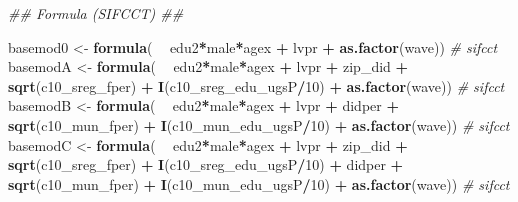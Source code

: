 \documentclass[
]{article}
\newenvironment{Shaded}{\begin{snugshade}}{\end{snugshade}}
\newcommand{\CommentTok}[1]{\textcolor[rgb]{0.56,0.35,0.01}{\textit{#1}}}
\newcommand{\DecValTok}[1]{\textcolor[rgb]{0.00,0.00,0.81}{#1}}
\newcommand{\KeywordTok}[1]{\textcolor[rgb]{0.13,0.29,0.53}{\textbf{#1}}}
\newcommand{\NormalTok}[1]{#1}
\newcommand{\OperatorTok}[1]{\textcolor[rgb]{0.81,0.36,0.00}{\textbf{#1}}}
\newcommand{\StringTok}[1]{\textcolor[rgb]{0.31,0.60,0.02}{#1}}
\begin{document}
\begin{Shaded}
\begin{Highlighting}[]
\CommentTok{## Formula (SIFCCT) ##}

\NormalTok{basemod0 <-}\StringTok{ }\KeywordTok{formula}\NormalTok{(  }\OperatorTok{~}\StringTok{ }\NormalTok{edu2}\OperatorTok{*}\NormalTok{male}\OperatorTok{*}\NormalTok{agex }\OperatorTok{+}\StringTok{ }\NormalTok{lvpr }\OperatorTok{+}\StringTok{  }
\StringTok{                        }\KeywordTok{as.factor}\NormalTok{(wave)) }\CommentTok{# sifcct}
\NormalTok{basemodA <-}\StringTok{ }\KeywordTok{formula}\NormalTok{(  }\OperatorTok{~}\StringTok{ }\NormalTok{edu2}\OperatorTok{*}\NormalTok{male}\OperatorTok{*}\NormalTok{agex }\OperatorTok{+}\StringTok{ }\NormalTok{lvpr }\OperatorTok{+}\StringTok{  }
\StringTok{                        }\NormalTok{zip_did }\OperatorTok{+}\StringTok{ }\KeywordTok{sqrt}\NormalTok{(c10_sreg_fper) }\OperatorTok{+}\StringTok{ }\KeywordTok{I}\NormalTok{(c10_sreg_edu_ugsP}\OperatorTok{/}\DecValTok{10}\NormalTok{) }\OperatorTok{+}\StringTok{ }
\StringTok{                        }\KeywordTok{as.factor}\NormalTok{(wave)) }\CommentTok{# sifcct}
\NormalTok{basemodB <-}\StringTok{ }\KeywordTok{formula}\NormalTok{(  }\OperatorTok{~}\StringTok{ }\NormalTok{edu2}\OperatorTok{*}\NormalTok{male}\OperatorTok{*}\NormalTok{agex }\OperatorTok{+}\StringTok{ }\NormalTok{lvpr }\OperatorTok{+}\StringTok{  }
\StringTok{                        }\NormalTok{didper }\OperatorTok{+}\StringTok{ }\KeywordTok{sqrt}\NormalTok{(c10_mun_fper) }\OperatorTok{+}\StringTok{ }\KeywordTok{I}\NormalTok{(c10_mun_edu_ugsP}\OperatorTok{/}\DecValTok{10}\NormalTok{) }\OperatorTok{+}\StringTok{ }
\StringTok{                        }\KeywordTok{as.factor}\NormalTok{(wave)) }\CommentTok{# sifcct}
\NormalTok{basemodC <-}\StringTok{ }\KeywordTok{formula}\NormalTok{(  }\OperatorTok{~}\StringTok{ }\NormalTok{edu2}\OperatorTok{*}\NormalTok{male}\OperatorTok{*}\NormalTok{agex }\OperatorTok{+}\StringTok{ }\NormalTok{lvpr }\OperatorTok{+}\StringTok{  }
\StringTok{                        }\NormalTok{zip_did }\OperatorTok{+}\StringTok{ }\KeywordTok{sqrt}\NormalTok{(c10_sreg_fper) }\OperatorTok{+}\StringTok{ }\KeywordTok{I}\NormalTok{(c10_sreg_edu_ugsP}\OperatorTok{/}\DecValTok{10}\NormalTok{) }\OperatorTok{+}\StringTok{ }
\StringTok{                        }\NormalTok{didper }\OperatorTok{+}\StringTok{ }\KeywordTok{sqrt}\NormalTok{(c10_mun_fper) }\OperatorTok{+}\StringTok{ }\KeywordTok{I}\NormalTok{(c10_mun_edu_ugsP}\OperatorTok{/}\DecValTok{10}\NormalTok{) }\OperatorTok{+}\StringTok{ }
\StringTok{                        }\KeywordTok{as.factor}\NormalTok{(wave)) }\CommentTok{# sifcct}


\end{Highlighting}
\end{Shaded}
\end{document}
